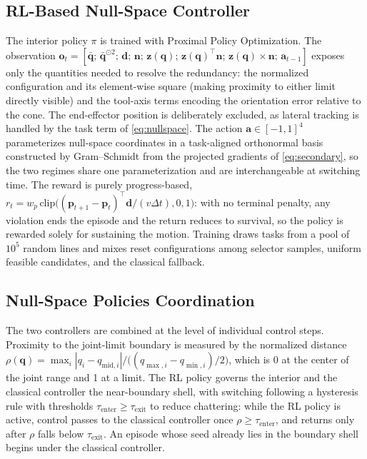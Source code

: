 \documentclass[journal]{IEEEtran}
\begin{document}
\subsection{RL-Based Null-Space Controller}
\label{sec:rl}
The interior policy $\pi$ is trained with Proximal Policy Optimization.
The observation
$\mathbf{o}_{t}=[\bar{\mathbf{q}};\,\bar{\mathbf{q}}^{\odot 2};\,
\mathbf{d};\,\mathbf{n};\,\mathbf{z}(\mathbf{q});\,
\mathbf{z}(\mathbf{q})^{\!\top}\mathbf{n};\,
\mathbf{z}(\mathbf{q}){\times}\mathbf{n};\,\mathbf{a}_{t-1}]$
exposes only the quantities needed to resolve the redundancy: the
normalized configuration and its element-wise square (making proximity
to either limit directly visible) and the tool-axis terms encoding the
orientation error relative to the cone. The end-effector position is
deliberately excluded, as lateral tracking is handled by the task term
of \eqref{eq:nullspace}. The action
$\mathbf{a}\in[-1,1]^{4}$ parameterizes null-space coordinates in a
task-aligned orthonormal basis constructed by Gram--Schmidt from the
projected gradients of \eqref{eq:secondary}, so the two regimes share
one parameterization and are interchangeable at switching time. The
reward is purely progress-based,
$r_{t}=w_{p}\,\mathrm{clip}\big((\mathbf{p}_{t+1}-\mathbf{p}_{t})^{\!\top}
\mathbf{d}/(v\Delta t),0,1\big)$: with no terminal penalty, any
violation ends the episode and the return reduces to survival, so the
policy is rewarded solely for sustaining the motion. Training draws
tasks from a pool of $10^{5}$ random lines and mixes reset
configurations among selector samples, uniform feasible candidates, and
the classical fallback.

\subsection{Null-Space Policies Coordination}
\label{sec:coord}
The two controllers are combined at the level of individual control
steps. Proximity to the joint-limit boundary is measured by the
normalized distance
$\rho(\mathbf{q})=\max_{i}
|q_{i}-q_{\mathrm{mid},i}|/\big((q_{\max,i}-q_{\min,i})/2\big)$,
which is 0 at the center of the joint range and 1 at a limit. The RL
policy governs the interior and the classical controller the
near-boundary shell, with switching following a hysteresis rule with
thresholds $\tau_{\mathrm{enter}}\geq\tau_{\mathrm{exit}}$ to reduce
chattering: while the RL policy is active, control passes to the
classical controller once $\rho\geq\tau_{\mathrm{enter}}$, and returns
only after $\rho$ falls below $\tau_{\mathrm{exit}}$. An episode whose
seed already lies in the boundary shell begins under the classical
controller.
\end{document}
